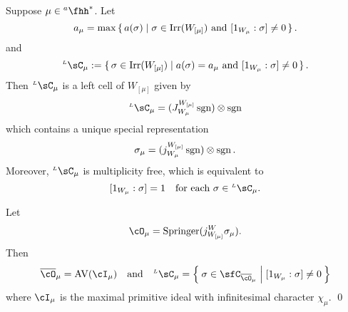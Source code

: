 \documentclass[counting_main.tex]{subfiles}
\begin{document}
\begin{lem}
  \label{lem:LC.mu}
  \label{lem:lcell.BV}
  Suppose $\mu\in \ahh^{*}$. Let
  \[
    a_{\mu} = \max\set{a(\sigma)| \sigma \in \mathrm{Irr}(W_{[\mu]}) \text{ and
      } [1_{W_{\mu}}: \sigma]\neq 0}.
  \]
  and
  \[
    \LC_{\mu} := \set{\sigma \in \Irr(W_{[\mu]}) | a(\sigma) = a_{\mu} \text{
        and } [1_{W_{\mu}}: \sigma]\neq 0 }.
  \]
  Then
  $\LC_{\mu}$ is a left cell of $W_{[\mu]}$ given by
  \begin{equation}\label{eq:LC.mu}
    \LC_{\mu}=(J_{W_{\mu}}^{W_{[\mu]}} \sgn )\otimes \sgn
  \end{equation}
  which contains a unique special representation
  \[
    \sigma_{\mu}=(j_{W_{\mu}}^{W_{[\mu]}} \operatorname{sgn} )\otimes \operatorname{sgn}.
  \]
  Moreover, $\LC_{\mu}$ is multiplicity free, which is equivalent to
  \[
    [1_{W_{\mu}}:\sigma]=1 \quad \text{for each } \sigma\in \LC_{\mu}.
  \]

  Let
  \begin{equation}\label{eq:O.mu}
    \cO_{\mu} = \Spr(j_{W_{[\mu]}}^{W}\sigma_{\mu}).
  \end{equation}
  Then
  \[
    \bcO_{\mu} = \AV(\cI_{\mu}) \AND \LC_{\mu} = \Set{\sigma\in \sfC_{\bcO_{\mu}}| [1_{W_{\mu}}:\sigma]\neq 0}
  \]
  where $\cI_{\mu}$ is the maximal primitive ideal with infinitesimal character
  $\chi_{\mu}$. \qed
\end{lem}
\end{document}

